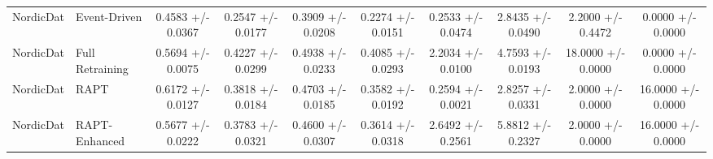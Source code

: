 \begin{tabular}{llcccccccc}
NordicDat & Event-Driven & 0.4583 +/- 0.0367 & 0.2547 +/- 0.0177 & 0.3909 +/- 0.0208 & 0.2274 +/- 0.0151 & 0.2533 +/- 0.0474 & 2.8435 +/- 0.0490 & 2.2000 +/- 0.4472 & 0.0000 +/- 0.0000 \\
NordicDat & Full Retraining & 0.5694 +/- 0.0075 & 0.4227 +/- 0.0299 & 0.4938 +/- 0.0233 & 0.4085 +/- 0.0293 & 2.2034 +/- 0.0100 & 4.7593 +/- 0.0193 & 18.0000 +/- 0.0000 & 0.0000 +/- 0.0000 \\
NordicDat & RAPT & 0.6172 +/- 0.0127 & 0.3818 +/- 0.0184 & 0.4703 +/- 0.0185 & 0.3582 +/- 0.0192 & 0.2594 +/- 0.0021 & 2.8257 +/- 0.0331 & 2.0000 +/- 0.0000 & 16.0000 +/- 0.0000 \\
NordicDat & RAPT-Enhanced & 0.5677 +/- 0.0222 & 0.3783 +/- 0.0321 & 0.4600 +/- 0.0307 & 0.3614 +/- 0.0318 & 2.6492 +/- 0.2561 & 5.8812 +/- 0.2327 & 2.0000 +/- 0.0000 & 16.0000 +/- 0.0000 \\
\bottomrule
\end{tabular}
